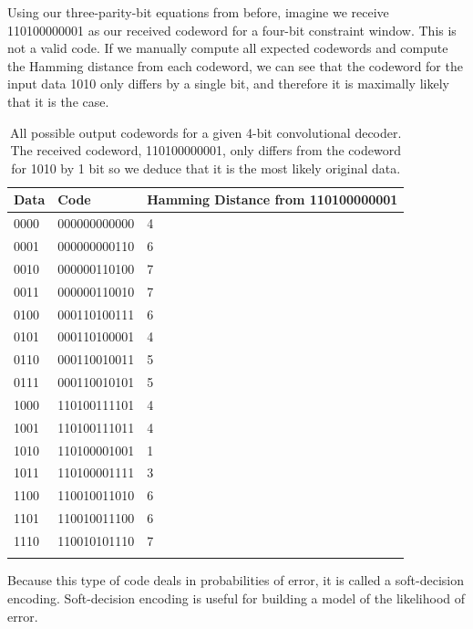 \documentclass[12pt]{article}
\begin{document}
Using our three-parity-bit equations from before, imagine we receive 110100000001 as our received codeword for a four-bit constraint window. This is not a valid code. If we manually compute all expected codewords and compute the Hamming distance from each codeword, we can see that the codeword for the input data 1010 only differs by a single bit, and therefore it is maximally likely that it is the case. \cite{rsg}

\begin{longtable}{| p{} | p{} | p{} |} 
\hline
\textbf{Data} & \textbf{Code}    &     \textbf{Hamming Distance from 110100000001}  \\ \hline
0000 & 000000000000 & 4                \\ \hline
0001 & 000000000110 & 6                \\ \hline
0010 & 000000110100 & 7                \\ \hline
0011 & 000000110010 & 7                \\ \hline
0100 & 000110100111 & 6                \\ \hline
0101 & 000110100001 & 4                \\ \hline
0110 & 000110010011 & 5                \\ \hline
0111 & 000110010101 & 5                \\ \hline
1000 & 110100111101 & 4                \\ \hline
1001 & 110100111011 & 4                \\ \hline
1010 & 110100001001 & 1                \\ \hline
1011 & 110100001111 & 3                \\ \hline
1100 & 110010011010 & 6                \\ \hline
1101 & 110010011100 & 6                \\ \hline
1110 & 110010101110 & 7                \\ \hline
\caption{All possible output codewords for a given 4-bit convolutional decoder. The received codeword, 110100000001, only differs from the codeword for 1010 by 1 bit so we deduce that it is the most likely original	 data.}
\label{tab:tab}
\end{longtable}

Because this type of code deals in probabilities of error, it is called a soft-decision encoding. Soft-decision encoding is useful for building a model of the likelihood of error. \cite{tanenbaum}
\end{document}
